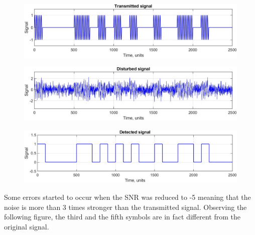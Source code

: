 \begin{figure}[h!]
    \centering
    \includegraphics[width = .85\textwidth]{lab-2/imgs/task8.3_Transmitted.jpg}
\end{figure}
\vspace{-15px}
\begin{figure}[h!]
    \centering
    \includegraphics[width = .85\textwidth]{lab-2/imgs/task8.3_Noise.jpg}
\end{figure}
\vspace{-15px}
\begin{figure}[h!]
    \centering
    \includegraphics[width = .85\textwidth]{lab-2/imgs/task8.3_Detected.jpg}
\end{figure}

\FloatBarrier\noindent Some errors started to occur when the SNR was reduced to -5 meaning that the noise is more than 3 times stronger than the transmitted signal. Observing the following figure, the third and the fifth symbols are in fact different from the original signal.

